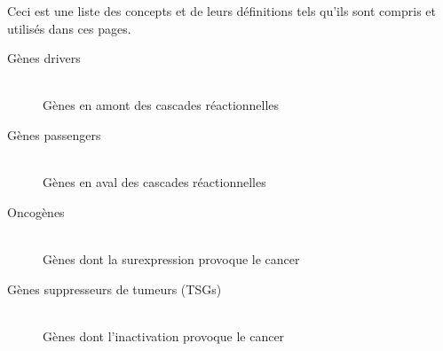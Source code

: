 	{\noindent}Ceci est une liste des concepts et de leurs définitions tels qu'ils sont compris et utilisés dans ces pages.
	\begin{description}
	    \item[Gènes drivers]     								\hfill \\
	        Gènes en amont des cascades réactionnelles
	    \item[Gènes passengers]  								\hfill \\
	        Gènes en aval des cascades réactionnelles
	    \item[Oncogènes]        								\hfill \\
	        Gènes dont la surexpression provoque le cancer
	    \item[Gènes suppresseurs de tumeurs (\acsp{TSG})]       \hfill \\
	        Gènes dont l'inactivation provoque le cancer
	\end{description}
